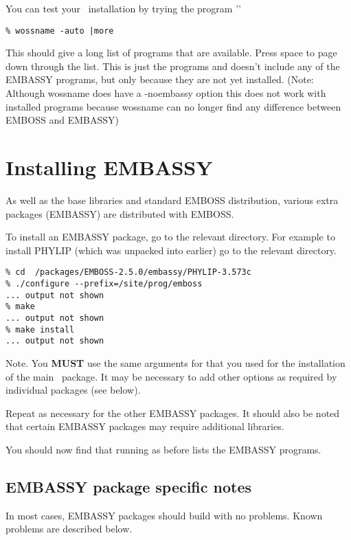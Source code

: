 \documentclass{report}
\begin{document}
You can test your \EMBOSS\ installation by trying the program
''

\begin{verbatim}
% wossname -auto |more
\end{verbatim}

This should give a long list of programs that are available. Press
space to page down through the list. This is just the \EMBOSS
programs and doesn't include any of the EMBASSY programs, but only
because they are not yet installed. (Note: Although wossname does have
a -noembassy option this does not work with installed programs because
wossname can no longer find any difference between EMBOSS and EMBASSY)

\section{Installing EMBASSY}

As well as the base libraries and standard EMBOSS distribution,
various extra packages (EMBASSY) are distributed with EMBOSS.

To install an EMBASSY package, go to the relevant directory. For
example to install PHYLIP (which was unpacked into
 earlier) go to
the relevant directory.

\begin{verbatim}
% cd  /packages/EMBOSS-2.5.0/embassy/PHYLIP-3.573c
% ./configure --prefix=/site/prog/emboss
... output not shown
% make
... output not shown
% make install
... output not shown
\end{verbatim}

Note. You {\bf MUST} use the same arguments for 
that you used for the installation of the main \EMBOSS\ package. It
may be necessary to add other options as required by individual
packages (see below).

Repeat as necessary for the other EMBASSY packages. It should also be
noted that certain EMBASSY packages may require additional libraries.
 
You should now find that running  as before lists
the EMBASSY programs.

\subsection{EMBASSY package specific notes}

In most cases, EMBASSY packages should build with no problems. Known
problems are described below.
\end{document}
